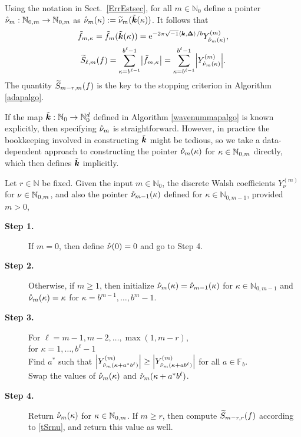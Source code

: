 \documentclass[graybox,footinfo]{svmult}
\newcommand{\N}{\mathbb{N}} %
\newcommand{\F}{\mathbb{F}} %
\newcommand{\bsDelta}{\boldsymbol{\Delta}}    %
\begin{document}
Using the notation in Sect.\ \ref{ErrEstsec}, for all $m \in \N_0$ define a pointer $\rnu_m:\natm \to \natm$ as $\mathring{\nu}_m(\kappa) := \widetilde{\nu}_m(\tilde{\boldsymbol{k}}(\kappa))$. It follows that 
\begin{gather}
\nonumber
\tf_{m,\kappa} = \tf_m(\tvk(\kappa)) = \E^{-2 \pi \sqrt{-1} \ip{\bsk}{\bsDelta}/b} Y^{(m)}_{\rnu_m(\kappa)}, \\
\label{tSrnu}
\tS_{\ell,m}(f) = \sum_{\kappa=b^{\ell-1}}^{b^{\ell}-1} \bigabs{ \tf_{m,\kappa}} = \sum_{\kappa=b^{\ell-1}}^{b^{\ell}-1} \Bigabs{ Y^{(m)}_{\rnu_m(\kappa)}}.
\end{gather}
The quantity $\widetilde{S}_{m-r,m}(f)$ is the key to the stopping criterion in Algorithm \ref{adapalgo}.

If the map $\tvk:\N_0 \to \N_0^d$ defined in Algorithm \ref{wavenummapalgo} is known explicitly, then specifying $\mathring{\nu}_m$ is straightforward.  However, in practice the bookkeeping involved in constructing $\tilde{\boldsymbol{k}}$ might be tedious, so we take a data-dependent approach to constructing the pointer $\mathring{\nu}_m(\kappa)$ for $\kappa \in \natm$ directly, which then defines $\tilde{\boldsymbol{k}}$ implicitly. 

\begin{algo} \label{pointeralgo} Let $r \in \N$ be fixed.  Given the input $m \in \N_0$, the discrete Walsh coefficients $Y^{(m)}_\nu$ for $\nu \in \natm$, and also the pointer $\mathring{\nu}_{m-1}(\kappa)$ defined for $\kappa \in \N_{0,m-1}$, provided $m>0$, 
\begin{description}  
\item[\textbf{Step 1.}]  If $m=0$, then define $\mathring{\nu}(0)=0$ and go to Step 4.  
\item[\textbf{Step 2.}]  Otherwise, if $m \ge 1$, then initialize $\mathring{\nu}_m(\kappa)=\mathring{\nu}_{m-1}(\kappa)$ for $\kappa \in \N_{0,m-1}$ and $\mathring{\nu}_m(\kappa)=\kappa$ for $\kappa =b^{m-1}, \ldots, b^{m}-1$.

\item[\textbf{Step 3.}]  For $\ell =m-1, m-2, \ldots, \max(1,m-r)$,\\
\hspace*{1.5cm} for $\kappa = 1, \ldots, b^{\ell} -1 $ \\
\hspace*{2cm} Find $a^*$ such that $\Bigl \lvert Y^{(m)}_{\mathring{\nu}_m(\kappa+a^* b^{\ell})} \Bigr \rvert \ge \Bigl \lvert Y^{(m)}_{\mathring{\nu}_m(\kappa+a b^{\ell})} \Bigr \rvert $ for all $a \in \F_b$.\\
\hspace*{2cm} Swap the values of $\mathring{\nu}_m(\kappa)$ and $\mathring{\nu}_m(\kappa+a^* b^{\ell})$.

\item[\textbf{Step 4.}]  Return $\mathring{\nu}_m(\kappa)$ for $\kappa \in \natm$.  If $m \ge r$, then compute $\widetilde{S}_{m-r,r}(f)$ according to \eqref{tSrnu}, and return this value as well.

\end{description}
\end{algo}
\end{document}
